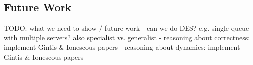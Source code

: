 \subsection{Future Work}
TODO: what we need to show / future work
	- can we do DES? e.g. single queue with multiple servers? also specialist vs. generalist
	- reasoning about correctness: implement Gintis \& Ionescous papers 
	- reasoning about dynamics: implement Gintis \& Ionescous papers